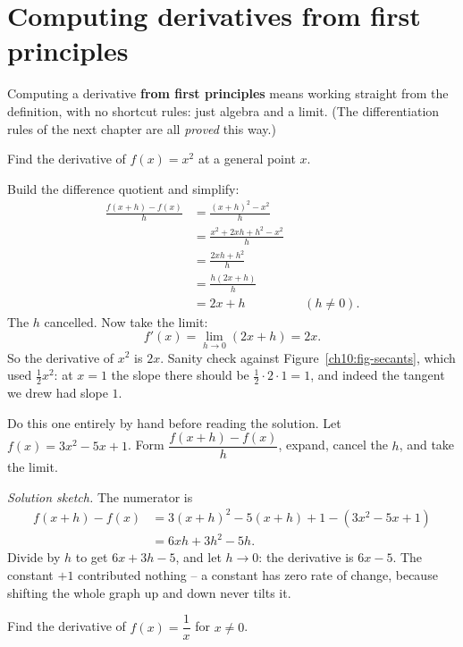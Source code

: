 \section{Computing derivatives from first principles}
\label{ch10:first-principles}

Computing a derivative \textbf{from first principles} means working straight
from the definition, with no shortcut rules: just algebra and a limit. (The
differentiation rules of the next chapter are all \emph{proved} this way.)

\begin{example}[A parabola]
\label{ch10:ex-square}
Find the derivative of $f(x) = x^2$ at a general point $x$.
\end{example}

\noindent Build the difference quotient and simplify:
\begin{align*}
  \frac{f(x + h) - f(x)}{h}
  &= \frac{(x + h)^2 - x^2}{h} \\[2pt]
  &= \frac{x^2 + 2xh + h^2 - x^2}{h} \\[2pt]
  &= \frac{2xh + h^2}{h} \\[2pt]
  &= \frac{h(2x + h)}{h} \\[2pt]
  &= 2x + h && (h \neq 0).
\end{align*}
The $h$ cancelled. Now take the limit:
\[
  f'(x) = \lim_{h \to 0} (2x + h) = 2x.
\]
So the derivative of $x^2$ is $2x$. Sanity check against
Figure~\ref{ch10:fig-secants}, which used $\tfrac12 x^2$: at $x = 1$ the slope
there should be $\tfrac12 \cdot 2 \cdot 1 = 1$, and indeed the tangent we drew had
slope $1$.

\begin{labbox}
Do this one entirely by hand before reading the solution. Let $f(x) = 3x^2 - 5x
+ 1$. Form $\dfrac{f(x+h) - f(x)}{h}$, expand, cancel the $h$, and take the limit.

\smallskip
\noindent\emph{Solution sketch.} The numerator is
\begin{align*}
  f(x+h) - f(x)
  &= 3(x+h)^2 - 5(x+h) + 1 - (3x^2 - 5x + 1) \\
  &= 6xh + 3h^2 - 5h.
\end{align*}
Divide by $h$ to get
$6x + 3h - 5$, and let $h \to 0$: the derivative is $6x - 5$. The constant
$+1$ contributed nothing -- a constant has zero rate of change, because shifting
the whole graph up and down never tilts it.
\end{labbox}

\begin{example}
\label{ch10:ex-recip}
Find the derivative of $f(x) = \dfrac{1}{x}$ for $x \neq 0$.
\end{example}

